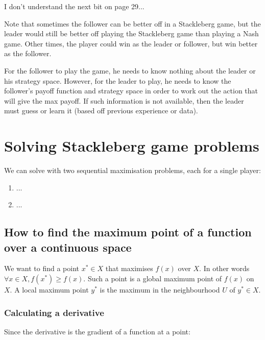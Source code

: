 I don't understand the next bit on page 29...


Note that sometimes the follower can be better off in a Stackleberg game, but
the leader would still be better off playing the Stackleberg game than playing a
Nash game. Other times, the player could win as the leader or follower, but win
better as the follower.

For the follower to play the game, he needs to know nothing about the leader or
his strategy space. However, for the leader to play, he needs to know the
follower's payoff function and strategy space in order to work out the action
that will give the max payoff. If such information is not available, then the
leader must guess or learn it (based off previous experience or data).


\section{Solving Stackleberg game problems}

We can solve with two sequential maximisation problems, each for a single
player:

\begin{enumerate}
  \item ...
  \item ...
\end{enumerate}

\subsection{How to find the maximum point of a function over a continuous space}

We want to find a point $x^* \in X$ that maximises $f(x)$ over $X$. In other
words $\forall x \in X, f(x^*) \geq f(x)$. Such a point is a global maximum
point of $f(x)$ on $X$. A local maximum point $y^*$ is the maximum in the
neighbourhood $U$ of $y^* \in X$.



\subsubsection{Calculating a derivative}

Since the derivative is the gradient of a function at a point:

